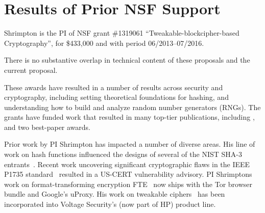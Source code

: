 \section{Results of Prior NSF Support}
\label{sec:prior}


Shrimpton is the PI of NSF grant \#1319061 
``Tweakable-blockcipher-based Cryptography'', for \$433,000 and with
period 06/2013--07/2016. 

There is no substantive overlap in technical
content of these proposals and the current proposal.

 These awards have resulted in a number of results
across security and cryptography, including setting theoretical foundations for
hashing, and understanding how
to build and analyze random number generators (RNGs). The grants have funded work that
resulted in many top-tier publications, including
\cite{DRS09,BCS-journal09,OSS,BRSS10,fischlin2010random,RSS,PRS11,dyer2012peek,clrw,tct,Dyer-2013,luchaup2014libfte,luchaup2014formatted},
and two best-paper awards. 

  Prior work by PI Shrimpton has impacted a
number of diverse areas.  His line of work on hash functions influenced the designs of several of the NIST
SHA-3 entrants~\cite{DRS09,BCS-journal09,BRSS10,RSS}.  
%
Recent work uncovering significant cryptographic flaws in the IEEE
P1735 standard~\cite{XXX} resulted in a US-CERT vulnerability advisory. 
%
PI Shrimptons work on format-transforming encryption FTE~\cite{Dyer-2013,luchaup2014libfte,luchaup2014formatted}
now ships with the Tor browser bundle and Google's uProxy. 
%
His work on tweakable ciphers~\cite{tct} has been incorporated into
Voltage Security's (now part of HP) product line.






